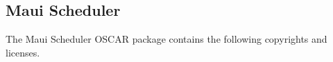 %
% 
% 
% 
% 
%

\subsection{Maui Scheduler}

The Maui Scheduler OSCAR package contains the following copyrights and
licenses.

